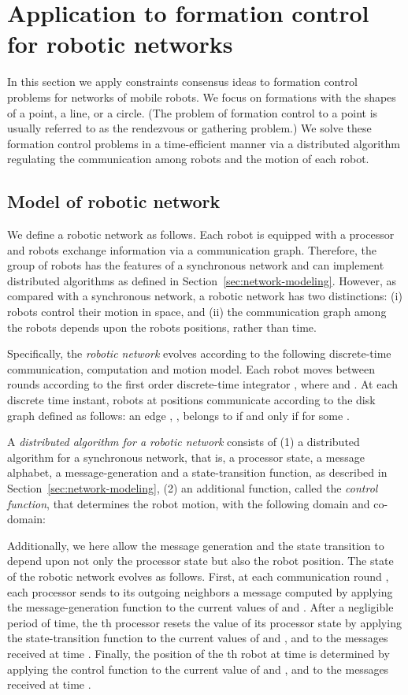 \documentclass[onecolumn,journal,letterpaper]{IEEEtran}
\begin{document}
\section{Application to formation control for robotic networks}
\label{sec:mintime-formation}

In this section we apply constraints consensus ideas to formation control
problems for networks of mobile robots.  We focus on formations with the
shapes of a point, a line, or a circle. (The problem of formation control
to a point is usually referred to as the rendezvous or gathering problem.)
We solve these formation control problems in a time-efficient manner via a
distributed algorithm regulating the communication among robots and the
motion of each robot.


\subsection{Model of robotic network}
We define a robotic network as follows. Each robot is equipped with a
processor and robots exchange information via a communication graph.
Therefore, the group of robots has the features of a synchronous network
and can implement distributed algorithms as defined in
Section~\ref{sec:network-modeling}. However, as compared with a synchronous
network, a robotic network has two distinctions: (i) robots control their
motion in space, and (ii) the communication graph among the robots depends
upon the robots positions, rather than time.

Specifically, the \emph{robotic network} evolves according to the following
discrete-time communication, computation and motion model. Each robot
 moves between rounds according to the first order
discrete-time integrator , where  and
.  At each discrete time instant, robots
at positions  communicate according to the disk graph
 defined as
follows: an edge , , belongs to
 if and only if
 for some .

A \emph{distributed algorithm for a robotic network} consists of (1) a
distributed algorithm for a synchronous network, that is, a processor
state, a message alphabet, a message-generation and a state-transition
function, as described in Section~\ref{sec:network-modeling}, (2) an
additional function, called the \emph{control function}, that determines
the robot motion, with the following domain and co-domain:

Additionally, we here allow the message generation and the state transition
to depend upon not only the processor state but also the robot position.
The state of the robotic network evolves as follows. First, at each
communication round , each processor  sends to its outgoing neighbors
a message computed by applying the message-generation function to the
current values of  and .  After a negligible
period of time, the th processor resets the value of its processor state
 by applying the state-transition function to the current
values of  and , and to the messages received
at time . Finally, the position  of the th robot at
time  is determined by applying the control function to the current
value of  and , and to the messages received
at time .
\end{document}
